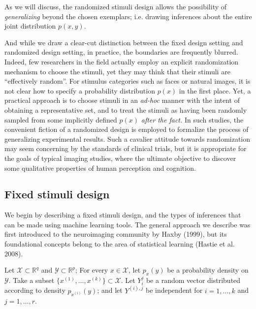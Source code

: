 \documentclass[12pt]{article}
\begin{document}
As we will discuss, the randomized stimuli design allows the
possibility of
\emph{generalizing} beyond the chosen exemplars;
i.e. drawing inferences about the entire joint distribution $p(x, y)$.

And while we draw a clear-cut distinction between the fixed design
setting and randomized design setting, in practice, the boundaries are
frequently blurred.  Indeed, few researchers in the field actually
employ an explicit randomization mechanism to choose the stimuli, yet
they may think that their stimuli are ``effectively random''.  For
stimulus categories such as faces or natural images, it is not clear
how to specify a probability distribution $p(x)$ in the first place.
Yet, a practical approach is to choose stimuli in an \emph{ad-hoc}
manner with the intent of obtaining a representative set, and to treat
the stimuli as having been randomly sampled from some implicitly
defined $p(x)$ \emph{after the fact.}  In such studies, the convenient
fiction of a randomized design is employed to formalize the process of
generalizing experimental results.  Such a cavalier attitude towards
randomization may seem concerning by the standards of clinical trials,
but it is appropriate for the goals of typical imaging studies, where
the ultimate objective to discover some qualitative properties of
human perception and cognition.

\subsection{Fixed stimuli design}


We begin by describing a fixed stimuli design, and the types of
inferences that can be made using machine learning tools.  The general
approach we describe was first introduced to the neuroimaging
community by Haxby (1999), but its foundational concepts belong to the
area of statistical learning (Hastie et al. 2008).

Let
$\mathcal{X} \subset \mathbb{R}^q$ and
$\mathcal{Y} \subset \mathbb{R}^p$; 
For every $x \in \mathcal{X}$, let $p_x(y)$
be a probability density on $\mathcal{Y}$.  
Take a subset $\{x^{(1)},\hdots, x^{(k)}\} \subset \mathcal{X}$.  Let
$Y_i^j$ be a random vector distributed according to density
$p_{x^{(i)}}(y)$; and let $Y^{(i),j}$ be independent for $i =
1,\hdots, k$ and $j = 1, \hdots, r.$
 
\end{document}
